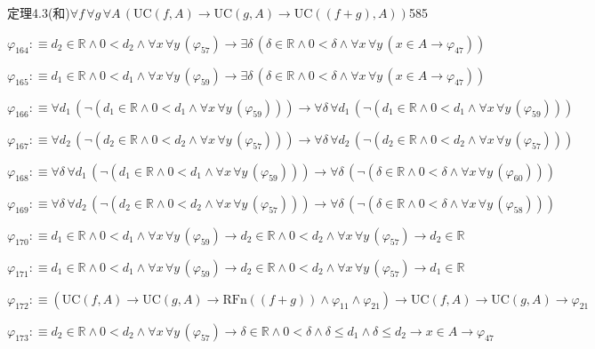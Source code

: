 \begin{fullproof}{定理4.3(和)}{$\forall f\,\forall g\,\forall A\,(\mathrm{UC}(f,A) \to \mathrm{UC}(g,A) \to \mathrm{UC}((f + g),A))$}{585}
\begin{abbrevlist}
\item $\varphi_{164} :\equiv d_{2} \in \mathbb{R} \land 0 < d_{2} \land \forall x\,\forall y\,(\varphi_{57}) \to \exists \delta\,(\delta \in \mathbb{R} \land 0 < \delta \land \forall x\,\forall y\,(x \in A \to \varphi_{47}))$
\item $\varphi_{165} :\equiv d_{1} \in \mathbb{R} \land 0 < d_{1} \land \forall x\,\forall y\,(\varphi_{59}) \to \exists \delta\,(\delta \in \mathbb{R} \land 0 < \delta \land \forall x\,\forall y\,(x \in A \to \varphi_{47}))$
\item $\varphi_{166} :\equiv \forall d_{1}\,(\neg (d_{1} \in \mathbb{R} \land 0 < d_{1} \land \forall x\,\forall y\,(\varphi_{59}))) \to \forall \delta\,\forall d_{1}\,(\neg (d_{1} \in \mathbb{R} \land 0 < d_{1} \land \forall x\,\forall y\,(\varphi_{59})))$
\item $\varphi_{167} :\equiv \forall d_{2}\,(\neg (d_{2} \in \mathbb{R} \land 0 < d_{2} \land \forall x\,\forall y\,(\varphi_{57}))) \to \forall \delta\,\forall d_{2}\,(\neg (d_{2} \in \mathbb{R} \land 0 < d_{2} \land \forall x\,\forall y\,(\varphi_{57})))$
\item $\varphi_{168} :\equiv \forall \delta\,\forall d_{1}\,(\neg (d_{1} \in \mathbb{R} \land 0 < d_{1} \land \forall x\,\forall y\,(\varphi_{59}))) \to \forall \delta\,(\neg (\delta \in \mathbb{R} \land 0 < \delta \land \forall x\,\forall y\,(\varphi_{60})))$
\item $\varphi_{169} :\equiv \forall \delta\,\forall d_{2}\,(\neg (d_{2} \in \mathbb{R} \land 0 < d_{2} \land \forall x\,\forall y\,(\varphi_{57}))) \to \forall \delta\,(\neg (\delta \in \mathbb{R} \land 0 < \delta \land \forall x\,\forall y\,(\varphi_{58})))$
\item $\varphi_{170} :\equiv d_{1} \in \mathbb{R} \land 0 < d_{1} \land \forall x\,\forall y\,(\varphi_{59}) \to d_{2} \in \mathbb{R} \land 0 < d_{2} \land \forall x\,\forall y\,(\varphi_{57}) \to d_{2} \in \mathbb{R}$
\item $\varphi_{171} :\equiv d_{1} \in \mathbb{R} \land 0 < d_{1} \land \forall x\,\forall y\,(\varphi_{59}) \to d_{2} \in \mathbb{R} \land 0 < d_{2} \land \forall x\,\forall y\,(\varphi_{57}) \to d_{1} \in \mathbb{R}$
\item $\varphi_{172} :\equiv (\mathrm{UC}(f,A) \to \mathrm{UC}(g,A) \to \mathrm{RFn}((f + g)) \land \varphi_{11} \land \varphi_{21}) \to \mathrm{UC}(f,A) \to \mathrm{UC}(g,A) \to \varphi_{21}$
\item $\varphi_{173} :\equiv d_{2} \in \mathbb{R} \land 0 < d_{2} \land \forall x\,\forall y\,(\varphi_{57}) \to \delta \in \mathbb{R} \land 0 < \delta \land \delta \leq d_{1} \land \delta \leq d_{2} \to x \in A \to \varphi_{47}$

\end{abbrevlist}
\end{fullproof}
